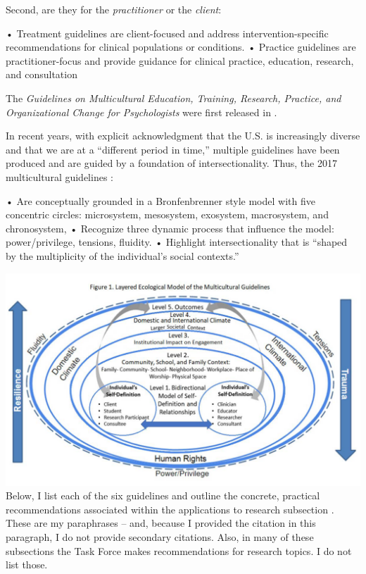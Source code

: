 \documentclass[
  english,
]{book}
\begin{document}
Second, are they for the \emph{practitioner} or the \emph{client}:

• Treatment guidelines are client-focused and address intervention-specific recommendations for clinical populations or conditions.
• Practice guidelines are practitioner-focus and provide guidance for clinical practice, education, research, and consultation

The \emph{Guidelines on Multicultural Education, Training, Research, Practice, and Organizational Change for Psychologists} were first released in \citep{american_psychological_association_guidelines_2002}.

In recent years, with explicit acknowledgment that the U.S. is increasingly diverse and that we are at a ``different period in time,'' multiple guidelines have been produced and are guided by a foundation of intersectionality. Thus, the 2017 multicultural guidelines \citep{task_force_on_re-envisioning_the_multicultural_guidelines_for_the_21st_century_multicultural_2017}:

• Are conceptually grounded in a Bronfenbrenner style model with five concentric circles: microsystem, mesosystem, exosystem, macrosystem, and chronosystem,
• Recognize three dynamic process that influence the model: power/privilege, tensions, fluidity.
• Highlight intersectionality that is ``shaped by the multiplicity of the individual's social contexts.''

\includegraphics{images/JEDI/Bronfenbrenner.png}
Below, I list each of the six guidelines and outline the concrete, practical recommendations associated within the applications to research subsection \citep{task_force_on_re-envisioning_the_multicultural_guidelines_for_the_21st_century_multicultural_2017}. These are my paraphrases -- and, because I provided the citation in this paragraph, I do not provide secondary citations. Also, in many of these subsections the Task Force makes recommendations for research topics. I do not list those.
\end{document}
